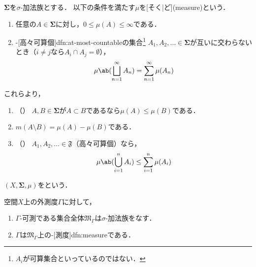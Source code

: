\documentclass[../sotsu.tex]{subfiles}
\begin{document}
\begin{definition}
    \label{dfn:measure}
    $𝚺$を$\sigma$-加法族とする．
    以下の条件を満たす$\mu$を[そく|ど](measure)という．
    \begin{enumerate}
        \item 任意の$A \in 𝚺$に対し，$0 \leq \mu(A) \leq \infty$である．
        \item {}-[高々可算個]{dfn:at-most-countable}の集合\footnote{$A_i$が可算集合といっているのではない．}%
            $A_1, A_2, \dotsc \in 𝚺$が互いに交わらないとき（$i \neq j$なら$A_i \cap A_j = \emptyset$），
            \begin{equation}
                \mu \ab( \bigsqcup_{n=1}^{\infty} A_n ) 
                    = \sum_{n=1}^{\infty} \mu (A_n)
            \end{equation}
    \end{enumerate}
    これらより，
    \begin{enumerate}[resume]
        \item \label{measure:monotonicity}（）
            $A, B \in 𝚺$が$A \subset B$であるなら$\mu(A) \leq \mu(B)$である．
        \item $m(A \setminus B) = \mu (A) - \mu (B)$である．
        \item \label{measure:subadditivity}（）
            $A_1, A_2, \dotsc \in 𝔉$（高々可算個）なら，
            \begin{equation*}
                \mu \ab( \bigcup_{i=1}^{n} A_i ) \leq \sum_{i=1}^{n} \mu(A_i)
            \end{equation*}
    \end{enumerate}
    $(X, 𝚺, \mu)$をという．
\end{definition}


\begin{proposition}
    空間$X$上の外測度$Γ$に対して，
    \begin{enumerate}
        \item $Γ$-可測である集合全体$𝔐_Γ$は$\sigma$-加法族をなす．
        \item $Γ$は$𝔐_Γ$上の-[測度]{dfn:measure}である．
    \end{enumerate}
\end{proposition}
\end{document}
